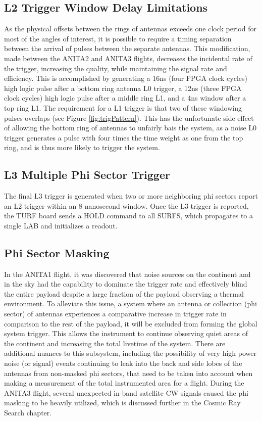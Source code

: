 	\subsection{L2 Trigger Window Delay Limitations}
		As the physical offsets between the rings of antennas exceeds one clock period for most of the angles of interest, it is possible to require a timing separation between the arrival of pulses between the separate antennas.  This modification, made between the ANITA2 and ANITA3 flights, decreases the incidental rate of the trigger, increasing the quality, while maintaining the signal rate and efficiency.  This is accomplished by generating a 16ns (four FPGA clock cycles) high logic pulse after a bottom ring antenna L0 trigger, a 12ns (three FPGA clock cycles) high logic pulse after a middle ring L1, and a 4ns window after a top ring L1.  The requirement for a L1 trigger is that two of these windowing pulses overlaps (see Figure \ref{fig:trigPattern}).  This has the unfortunate side effect of allowing the bottom ring of antennas to unfairly bais the system, as a noise L0 trigger generates a pulse with four times the time weight as one from the top ring, and is thus more likely to trigger the system.
		
	\subsection{L3 Multiple Phi Sector Trigger}
		The final L3 trigger is generated when two or more neighboring phi sectors report an L2 trigger within an 8 nanosecond window.  Once the L3 trigger is reported, the TURF board sends a HOLD command to all SURFS, which propagates to a single LAB and initializes a readout.

	\subsection{Phi Sector Masking}
		In the ANITA1 flight, it was discovered that noise sources on the continent and in the sky had the capability to dominate the trigger rate and effectively blind the entire payload despite a large fraction of the payload observing a thermal environment. To alleviate this issue, a system where an antenna or collection (phi sector) of antennas experiences a comparative increase in trigger rate in comparison to the rest of the payload, it will be excluded from forming the global system trigger.  This allows the instrument to continue observing quiet areas of the continent and increasing the total livetime of the system.  There are additional nuances to this subsystem, including the possibility of very high power noise (or signal) events continuing to leak into the back and side lobes of the antennas from non-masked phi sectors, that need to be taken into account when making a measurement of the total instrumented area for a flight.  During the ANITA3 flight, several unexpected in-band satellite CW signals caused the phi masking to be heavily utilized, which is discussed further in the Cosmic Ray Search chapter.
		
